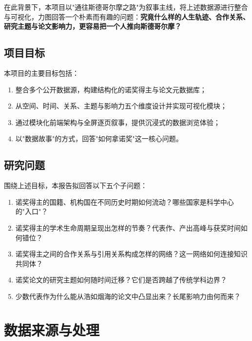 \documentclass[UTF8]{CjC}
\theoremstyle{mystyle}
\begin{document}
在此背景下，本项目以"通往斯德哥尔摩之路"为叙事主线，将上述数据源进行整合与可视化，力图回答一个朴素而有趣的问题：\textbf{究竟什么样的人生轨迹、合作关系、研究主题与论文影响力，更容易把一个人推向斯德哥尔摩？}

\subsection{项目目标}
本项目的主要目标包括：
\begin{enumerate}
    \item 整合多个公开数据源，构建结构化的诺奖得主与论文元数据库；
    \item 从空间、时间、关系、主题与影响力五个维度设计并实现可视化模块；
    \item 通过模块化前端架构与全屏逐页叙事，提供沉浸式的数据浏览体验；
    \item 以"数据故事"的方式，回答"如何拿诺奖"这一核心问题。
\end{enumerate}

\subsection{研究问题}
围绕上述目标，本报告拟回答以下五个子问题：
\begin{enumerate}
    \item 诺奖得主的国籍、机构国在不同历史时期如何流动？哪些国家是科学中心的"入口"？
    \item 诺奖得主的学术生命周期呈现出怎样的节奏？代表作、产出高峰与获奖时间如何错位？
    \item 诺奖得主之间的合作关系与引用关系构成怎样的网络？这一网络如何连接知识共同体？
    \item 诺奖论文的研究主题如何随时间迁移？它们是否跨越了传统学科边界？
    \item 少数代表作为什么能从浩如烟海的论文中凸显出来？长尾影响力由何而来？
\end{enumerate}

\section{数据来源与处理}
\end{document}

